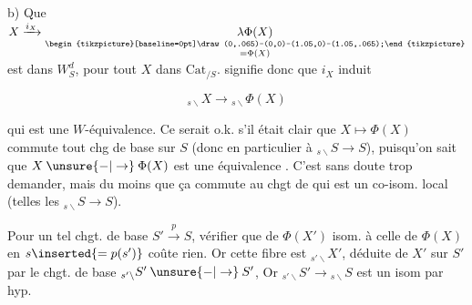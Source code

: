 b) Que $X\xrightarrow{i_X}\underset{\substack{\begin{tikzpicture}[baseline=0pt]\draw (0,.065)--(0,0)--(1.05,0)--(1.05,.065);\end{tikzpicture}\\=\Phi(X)}}{\lambda\Phi(X)}$ est dans $W_S^d$, pour tout $X$ dans $\mathrm{Cat}_{/S}$.  signifie donc que $i_X$ induit

\[
 {}_{s\backslash}X\longrightarrow{}_{s\backslash}\Phi(X)
\]

qui est une $W$-équivalence. Ce serait o.k. s'il était clair que $X\longmapsto\Phi(X)$ commute  tout chg de base  sur $S$ (donc en particulier à $ {}_{s\backslash}S\longrightarrow S$), puisqu'on sait que $X\mathbin{\unsure{-|\to}}\Phi(X)$ est une équivalence . C'est sans doute trop demander, mais du moins que ça commute au chgt de  qui est un co-isom. local (telles les $ {}_{s\backslash}S\longrightarrow S$).

 Pour un tel chgt. de base $S'\xrightarrow{p}S$, vérifier que    de $\Phi(X')$     isom. à celle de $\Phi(X)$ en $s\inserted{=p(s')}$  coûte rien. Or cette fibre est $ {}_{s'\backslash}X'$, déduite de $X'$ sur $S'$  par le chgt. de base $ {}_{s'\backslash}S'\mathbin{\unsure{-|\to}} S'$,  Or $ {}_{s'\backslash}S'\longrightarrow{}_{s\backslash}S$ est un isom par hyp.

